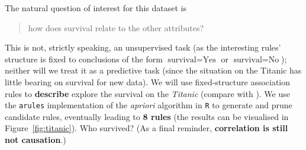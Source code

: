 The natural question of interest for this dataset is 
\begin{quote} how does survival relate to the other attributes? 
\end{quote} This is not, strictly speaking, an unsupervised task (as the interesting rules' structure is fixed to conclusions of the form $\textrm{survival} = \textrm{Yes}$ or $\textrm{survival} = \textrm{No}$); neither will we treat it as a predictive task (since the situation on the Titanic has little bearing on survival for new data). We will use fixed-structure association rules to \textbf{describe} explore the survival on the \textit{Titanic} (compare with \cite{DSML_MR}). 
We use the \texttt{arules} implementation of the \textit{apriori} algorithm in \texttt{R}  to generate and prune candidate rules, eventually leading to \textbf{8 rules} (the results can be visualised in Figure~\ref{fig:titanic}). Who survived? (As a final reminder, \textbf{correlation is still not causation}.)
